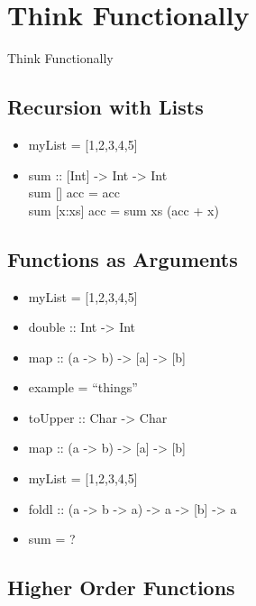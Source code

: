 \documentclass{beamer}                  %
\newcommand{\srule}{
	\rule{\textwidth}{1pt}\\
}
\newlength{\subsecwidth}
\newenvironment{slide}{
	\begin{frame} %
	\settowidth{\subsecwidth}{\insertsubsection} %
	\ifthenelse{\dimtest{\subsecwidth}{<}{1pt}}{ %
		\frametitle{\insertsection\\             %
		\vspace{-1ex}                            %
		\color{fore}\srule                       %
		\par                                     %
		\vspace{-3ex}                            %
		}
	}{                                           %
		\frametitle{\insertsection\ -- \insertsubsection\\ %
		\vspace{-1ex}                            %
		\color{fore}\srule                       %
		\par                                     %
		\vspace{-3ex}                            %
		}
	}
	\Large                                       %
}{
	\end{frame}
}
\newcommand{\titleslide}[1]{
	\section{#1}             %
	\begin{slide}
		\begin{center}
			\color{comments}
			\Huge            %
			#1               %
		\end{center}
	\end{slide}
}
\begin{document}
\titleslide{Think Functionally}

\subsection{Recursion with Lists}

\begin{slide}
  \begin{itemize}
    \item myList = [1,2,3,4,5]
    \item sum :: [Int] -> Int -> Int\\
          sum [] acc     = acc\\
          sum [x:xs] acc = sum xs (acc + x)
  \end{itemize}
\end{slide}

\subsection{Functions as Arguments}

\begin{slide}
  \begin{itemize}
    \item myList = [1,2,3,4,5]
    \item double :: Int -> Int
    \item map :: (a -> b) -> [a] -> [b]
  \end{itemize}
\end{slide}

\begin{slide}
  \begin{itemize}
    \item example = ``things''
    \item toUpper :: Char -> Char
    \item map :: (a -> b) -> [a] -> [b]
  \end{itemize}
\end{slide}

\begin{slide}
  \begin{itemize}
    \item myList = [1,2,3,4,5]
    \item foldl :: (a -> b -> a) -> a -> [b] -> a
    \item sum = ?
  \end{itemize}
\end{slide}

\subsection{Higher Order Functions}
\end{document}
